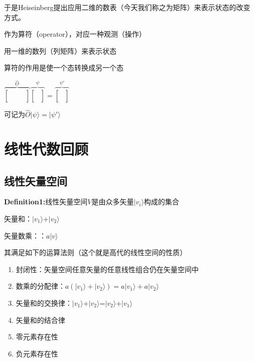 \documentclass[lang=cn,15pt]{elegantbook}
\begin{document}
于是Heiseinberg提出应用二维的数表（今天我们称之为矩阵）来表示状态的改变方式。

作为算符（operator），对应一种观测（操作）

用一维的数列（列矩阵）来表示状态

算符的作用是使一个态转换成另一个态

$\overset{\hat{O}}{\overbrace{\left[ \begin{matrix}
			&		&		\\
			&		&		\\
			&		&		\\
		\end{matrix} \right] }}\overset{\psi}{\overbrace{\left[ \begin{array}{c}
			\\
			\\
			\\
		\end{array} \right] }}=\overset{\psi'}{\overbrace{\left[ \begin{array}{c}
			\\
			\\
			\\
		\end{array} \right] }}$
	
	
可记为$\hat{O}|\psi \rangle =|\psi' \rangle $

\section{线性代数回顾}
\subsection{线性矢量空间}

\textbf{Definition1:}线性矢量空间$V$是由众多矢量$|v_i \rangle $构成的集合

矢量和：$|v_1 \rangle $+$|v_2 \rangle $

矢量数乘：：$a|v \rangle $

其满足如下的运算法则（这个就是高代的线性空间的性质）
\begin{enumerate}
	\item 封闭性：矢量空间任意矢量的任意线性组合仍在矢量空间中
	\item 数乘的分配律：$a(|v_1 \rangle +|v_2 \rangle)=a|v_1 \rangle +a|v_2 \rangle$
	\item 矢量和的交换律：$|v_1 \rangle $+$|v_2 \rangle $=$|v_2 \rangle $+$|v_1 \rangle $
	\item 矢量和的结合律
	\item 零元素存在性
	\item 负元素存在性
\end{enumerate}
\end{document}
